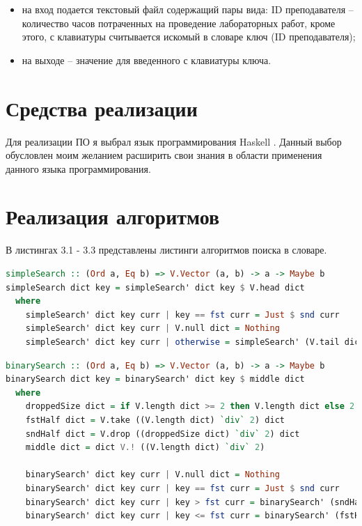 \documentclass[12pt]{report}
\begin{document}
	\begin{itemize}
		\item на вход подается текстовый файл содержащий пары вида: ID преподавателя -- количество часов потраченных на проведение лабораторных работ, кроме этого, с клавиатуры считывается искомый в словаре ключ (ID преподавателя);
		\item на выходе -- значение для введенного с клавиатуры ключа.
	\end{itemize}
	
	\section{Средства реализации}
	
	Для реализации ПО я выбрал язык программирования Haskell \cite{Haskell}. Данный выбор обусловлен моим желанием расширить свои знания в области применения данного языка программирования.
	
\section{Реализация алгоритмов}

В листингах 3.1 - 3.3 представлены листинги алгоритмов поиска в словаре.
	
\begin{lstlisting}[label=some-code,caption=Алгоритм полного перебора, language=Haskell]
simpleSearch :: (Ord a, Eq b) => V.Vector (a, b) -> a -> Maybe b
simpleSearch dict key = simpleSearch' dict key $ V.head dict 
  where
    simpleSearch' dict key curr | key == fst curr = Just $ snd curr
    simpleSearch' dict key curr | V.null dict = Nothing
    simpleSearch' dict key curr | otherwise = simpleSearch' (V.tail dict) key $ V.head dict
\end{lstlisting}
	
\begin{lstlisting}[label=some-code,caption=Алгоритм двоичного поиска, language=Haskell]
binarySearch :: (Ord a, Eq b) => V.Vector (a, b) -> a -> Maybe b 
binarySearch dict key = binarySearch' dict key $ middle dict
  where
    droppedSize dict = if V.length dict >= 2 then V.length dict else 2
    fstHalf dict = V.take ((V.length dict) `div` 2) dict
    sndHalf dict = V.drop ((droppedSize dict) `div` 2) dict
    middle dict = dict V.! ((V.length dict) `div` 2)

	binarySearch' dict key curr | V.null dict = Nothing
	binarySearch' dict key curr | key == fst curr = Just $ snd curr
	binarySearch' dict key curr | key > fst curr = binarySearch' (sndHalf dict) key (middle $ sndHalf dict)
	binarySearch' dict key curr | key <= fst curr = binarySearch' (fstHalf dict) key $ (middle $ fstHalf dict)
\end{lstlisting}
\end{document}
